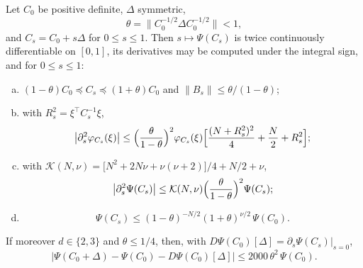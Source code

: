\begin{proposition}\label{prop:correction-taylor}
Let $C_0$ be positive definite, $\Delta$ symmetric,
\[
\theta=\bigl\|C_0^{-1/2}\Delta C_0^{-1/2}\bigr\|<1,
\]
and $C_s=C_0+s\Delta$ for $0\le s\le1$. Then $s\mapsto\Psi(C_s)$ is twice continuously differentiable on $[0,1]$, its derivatives may be computed under the integral sign, and for $0\le s\le1$:
\begin{enumerate}[(a)]
\item $(1-\theta)C_0\preccurlyeq C_s\preccurlyeq(1+\theta)C_0$ and $\|B_s\|\le\theta/(1-\theta)$;
\item with $R_s^2=\xi^{\top}C_s^{-1}\xi$,
\begin{equation}\label{eq:correction-pointwise}
\bigl|\partial_s^2\varphi_{C_s}(\xi)\bigr|\le\Bigl(\frac{\theta}{1-\theta}\Bigr)^2\varphi_{C_s}(\xi)\Bigl[\frac{(N+R_s^2)^2}4+\frac N2+R_s^2\Bigr];
\end{equation}
\item with $\mathcal K(N,\nu)=\bigl[N^2+2N\nu+\nu(\nu+2)\bigr]/4+N/2+\nu$,
\begin{equation}\label{eq:correction-second}
\bigl|\partial_s^2\Psi(C_s)\bigr|\le\mathcal K(N,\nu)\Bigl(\frac{\theta}{1-\theta}\Bigr)^2\Psi(C_s);
\end{equation}
\item
\begin{equation}\label{eq:correction-ratio}
\Psi(C_s)\le(1-\theta)^{-N/2}(1+\theta)^{\nu/2}\,\Psi(C_0).
\end{equation}
\end{enumerate}
If moreover $d\in\{2,3\}$ and $\theta\le1/4$, then, with $D\Psi(C_0)[\Delta]=\partial_s\Psi(C_s)|_{s=0}$,
\begin{equation}\label{eq:correction-taylor}
\bigl|\Psi(C_0+\Delta)-\Psi(C_0)-D\Psi(C_0)[\Delta]\bigr|\le2000\,\theta^2\,\Psi(C_0).
\end{equation}
\end{proposition}

